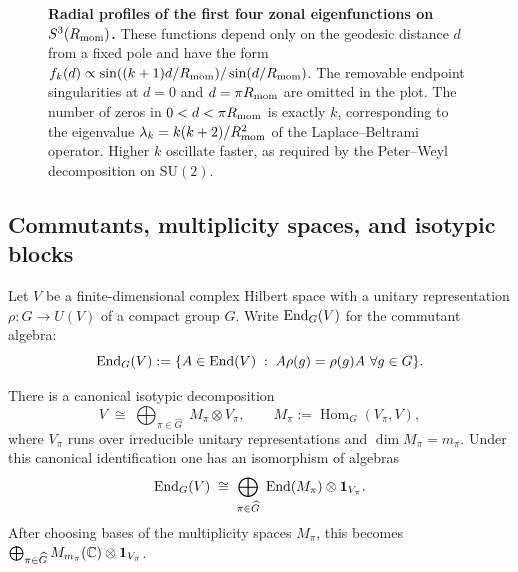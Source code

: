 \documentclass[11pt]{article}
\DeclareMathOperator{\Hom}{Hom}
\begin{document}
\begin{figure}[htbp]
\centering
{}

\caption[Radial profiles of the first four zonal eigenfunctions on \(S^3\)]{%
\textbf{Radial profiles of the first four zonal eigenfunctions on \(S^3(R_{\mathrm{mom}})\).}
These functions depend only on the geodesic distance \(d\) from a fixed pole and have the form
\(f_k(d)\propto \sin((k+1)d/R_{\mathrm{mom}})/\sin(d/R_{\mathrm{mom}})\).
The removable endpoint singularities at \(d=0\) and \(d=\pi R_{\mathrm{mom}}\) are omitted in the plot.
The number of zeros in \(0<d<\pi R_{\mathrm{mom}}\) is exactly \(k\), corresponding to the eigenvalue
\(\lambda_k = k(k+2)/R_{\mathrm{mom}}^2\)
of the Laplace--Beltrami operator.
Higher \(k\) oscillate faster, as required by the Peter--Weyl decomposition on \(\mathrm{SU}(2)\).%
}
\label{fig:eigenfunctions}
\end{figure}


\subsection{Commutants, multiplicity spaces, and isotypic blocks}
\label{p1:subsec:commutants-multiplicity}

Let $V$ be a finite-dimensional complex Hilbert space with a unitary representation $\rho:G\to U(V)$ of a
compact group $G$. Write $\operatorname{End}_G(V)$ for the commutant algebra:
\[
\End_G(V):=\{A\in\End(V)\;:\;A\rho(g)=\rho(g)A\ \forall g\in G\}.
\]

\begin{theorem}
\label{p1:thm:isotypic-commutant}
There is a canonical isotypic decomposition
\[
V\;\cong\;\bigoplus_{\pi\in\widehat G}\; M_\pi\otimes V_\pi,
\qquad
M_\pi:=\Hom_G(V_\pi,V),
\]
where $V_\pi$ runs over irreducible unitary representations and $\dim M_\pi=m_\pi$. Under
this canonical identification one has an isomorphism of algebras
\[
\operatorname{End}_G(V)\;\cong\;\bigoplus_{\pi\in\widehat G}\;\operatorname{End}(M_\pi)\otimes \mathbf 1_{V_\pi}.
\]
After choosing bases of the multiplicity spaces $M_\pi$, this becomes
\(\bigoplus_{\pi\in\widehat G}M_{m_\pi}(\mathbb{C})\otimes\mathbf 1_{V_\pi}\).
\end{theorem}
\end{document}
